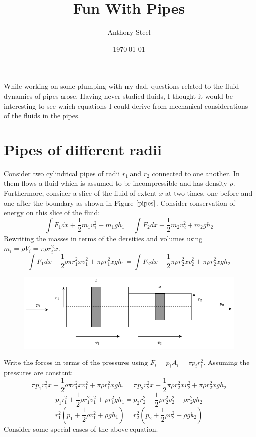 \documentclass[9pt]{article}
\begin{document}
\title{Fun With Pipes}
\author{Anthony Steel}
\date{\today}
\maketitle
While working on some plumping with my dad, questions related to the fluid
dynamics of pipes arose. Having never studied fluids, I thought it would be
interesting to see which equations I could derive from mechanical considerations
of the fluids in the pipes.
\section{Pipes of different radii}
Consider two cylindrical pipes of radii $r_1$ and $r_2$ connected to one another.
In them flows a fluid which is assumed to be incompressible and has density $\rho$.
Furthermore, consider a slice of the fluid of extent $x$ at two times, one
before and one after the boundary as shown in Figure $\ref{pipes}$. Consider
conservation of energy on this slice of the fluid:
\[
  \int F_1 dx + \frac{1}{2} m_1 v_1^2 + m_1 g h_1 = \int F_2 dx + \frac{1}{2} m_2 v_2^2 + m_2 g h_2
\]
Rewriting the masses in terms of the densities and volumes using $m_i = \rho V_i = \pi \rho r_i^2 x$.
\[
  \int F_1 dx + \frac{1}{2} \rho \pi r_1^2 x v_1^2  + \pi \rho r_1^2 x g h_1 = \int F_2 dx + \frac{1}{2} \pi \rho r_2^2 x v_2^2 + \pi \rho r_2^2 x g h_2
\]
\begin{figure}
  \begin{center}
  \includegraphics[width=1.0\textwidth]{images/pipes.png}
  \end{center}
  \caption{}
  \label{pipes}
\end{figure}
Write the forces in terms of the pressures using $F_i = p_i A_i = \pi p_i r_i^2$.
Assuming the pressures are constant:
\[
  \pi p_1 r_1^2 x + \frac{1}{2} \rho \pi r_1^2 x v_1^2  + \pi \rho r_1^2 x g h_1 = \pi p_2 r_2^2 x + \frac{1}{2} \pi \rho r_2^2 x v_2^2 + \pi \rho r_2^2 x g h_2
\]
\[
  p_1 r_1^2 + \frac{1}{2} \rho r_1^2 v_1^2  + \rho r_1^2 g h_1 = p_2 r_2^2 + \frac{1}{2} \rho r_2^2 v_2^2 + \rho r_2^2 g h_2
\]
\[
  r_1^2 (p_1 + \frac{1}{2} \rho v_1^2  + \rho g h_1) = r_2^2 (p_2 + \frac{1}{2} \rho v_2^2 + \rho g h_2)
\]
Consider some special cases of the above equation.
\end{document}
